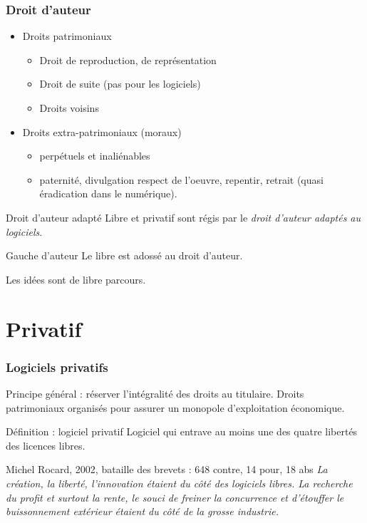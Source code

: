 \documentclass{beamer}
\begin{document}
\begin{frame}\frametitle{Droit d'auteur}

  \begin{itemize}
  \item Droits patrimoniaux
    \begin{itemize}
    \item Droit de reproduction, de représentation
    \item Droit de suite (pas pour les logiciels)
    \item Droits voisins
    \end{itemize}
  \item Droits extra-patrimoniaux (moraux)
    \begin{itemize}
    \item perpétuels et inaliénables
    \item paternité, divulgation respect de l'oeuvre, repentir,
      retrait (quasi éradication dans le numérique).
    \end{itemize}
  \end{itemize}

 \begin{alertblock}{Droit d'auteur adapté}
   Libre et privatif sont régis par le \textit{droit d'auteur adaptés
     au logiciels}.
 \end{alertblock}

  \begin{alertblock}{Gauche d'auteur}
    Le libre est adossé au droit d'auteur.
  \end{alertblock}
  
  Les idées sont de libre parcours.
\end{frame}


\section{Privatif}


\begin{frame}\frametitle{Logiciels privatifs}
  Principe général : réserver l'intégralité des droits au
  titulaire. Droits patrimoniaux organisés pour assurer un monopole
  d'exploitation économique.

  \begin{alertblock}{Définition : logiciel privatif}
    Logiciel qui entrave au moins une des quatre libertés des licences
    libres.
  \end{alertblock}

  \pause

\begin{block}{Michel Rocard, 2002, bataille des brevets : 648 contre,
    14 pour, 18 abs}
  \textit{ La création, la liberté, l'innovation étaient du côté des
    logiciels libres. La recherche du profit et surtout la rente, le
    souci de freiner la concurrence et d'étouffer le buissonnement
    extérieur étaient du côté de la grosse industrie.  }
\end{block}
\end{frame}
\end{document}

